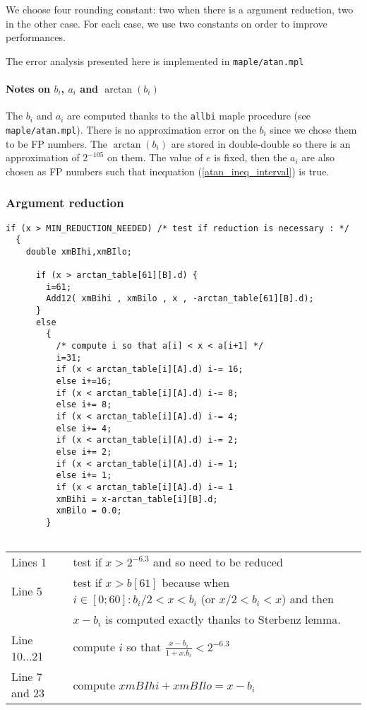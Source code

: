 We choose four rounding constant: two when there is a argument
reduction, two in the other case. For each case, we use two constants
on order to improve performances.

The error analysis presented here is implemented in
\texttt{maple/atan.mpl}

\paragraph{Notes on $b_i$, $a_i$ and $\arctan(b_i)$}
The $b_i$ and $a_i$ are computed thanks to the \texttt{allbi} maple
procedure (see \texttt{maple/atan.mpl}). There is no approximation
error on the $b_i$ since we chose them to be FP numbers. The $\arctan
(b_i)$ are stored in double-double so there is an approximation of
$2^{-105}$ on them. The value of $e$ is fixed, then the $a_i$ are also
chosen as FP numbers such that inequation (\ref{atan_ineq_interval})
is true.

\subsubsection{Argument reduction}

\begin{lstlisting}[caption={Reduction part 1},firstnumber=1]
  if (x > MIN_REDUCTION_NEEDED) /* test if reduction is necessary : */ 
  {
    double xmBIhi,xmBIlo;      

      if (x > arctan_table[61][B].d) {
        i=61;
        Add12( xmBihi , xmBilo , x , -arctan_table[61][B].d);
      }
      else
        {
          /* compute i so that a[i] < x < a[i+1] */
          i=31;
          if (x < arctan_table[i][A].d) i-= 16;
          else i+=16;
          if (x < arctan_table[i][A].d) i-= 8;
          else i+= 8;
          if (x < arctan_table[i][A].d) i-= 4;
          else i+= 4;
          if (x < arctan_table[i][A].d) i-= 2;
          else i+= 2;
          if (x < arctan_table[i][A].d) i-= 1;
          else i+= 1;
          if (x < arctan_table[i][A].d) i-= 1
          xmBihi = x-arctan_table[i][B].d;
          xmBilo = 0.0;
        }
      
\end{lstlisting}

\begin{tabular}{ll}
Lines  1 & test if $x > 2^{-6.3}$ and so need to be reduced\\
Line 5 & test if $x>b[61]$ because when $i \in [0;60] : b_i/2 < x <
b_i$ (or $ x/2 < b_i < x$) and then \\&$x-b_i$ is computed exactly
thanks to Sterbenz lemma.\\
Line 10...21 & compute $i$ so that $\frac{x-b_i}{1+x.b_i} < 2^{-6.3} $\\
Line 7 and 23 & compute $xmBIhi + xmBIlo = x - b_i$

\end{tabular}

